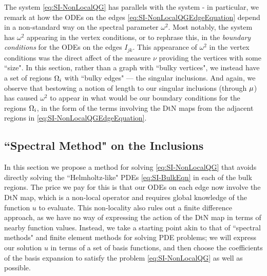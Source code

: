 The system \eqref{eq:SI-NonLocalQG} has parallels with the system  - in particular, we remark at how the ODEs on the edges \eqref{eq:SI-NonLocalQGEdgeEquation} depend in a non-standard way on the spectral parameter $\omega^2$.
Most notably, the system  has $\omega^2$ appearing in the vertex conditions, or to rephrase this, in the \emph{boundary conditions} for the ODEs on the edges $I_{jk}$.
This appearance of $\omega^2$ in the vertex conditions was the direct affect of the measure $\nu$ providing the vertices with some ``size".
In this section, rather than a graph with ``bulky vertices", we instead have a set of regions $\Omega_i$ with ``bulky edges" --- the singular inclusions.
And again, we observe that bestowing a notion of length to our singular inclusions (through $\mu$) has caused $\omega^2$ to appear in what would be our boundary conditions for the regions $\Omega_i$, in the form of the terms involving the DtN maps from the adjacent regions in \eqref{eq:SI-NonLocalQGEdgeEquation}.

\subsection{``Spectral Method" on the Inclusions} \label{ssec:SI-GraphMethod}

In this section we propose a method for solving \eqref{eq:SI-NonLocalQG} that avoids directly solving the ``Helmholtz-like" PDEs \eqref{eq:SI-BulkEqn} in each of the bulk regions.
The price we pay for this is that our ODEs on each edge now involve the DtN map, which is a non-local operator and requires global knowledge of the function $u$ to evaluate.
This non-locality also rules out a finite difference approach, as we have no way of expressing the action of the DtN map in terms of nearby function values.
Instead, we take a starting point akin to that of ``spectral methods" and finite element methods for solving PDE problems; we will express our solution $u$ in terms of a set of basis functions, and then choose the coefficients of the basis expansion to satisfy the problem \eqref{eq:SI-NonLocalQG} as well as possible.

